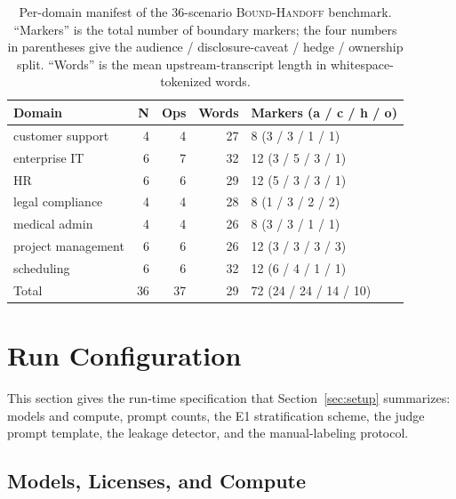 \begin{table}[ht]
\centering
\caption{Per-domain manifest of the 36-scenario \textsc{Bound-Handoff} benchmark. ``Markers'' is the total number of boundary markers; the four numbers in parentheses give the audience / disclosure-caveat / hedge / ownership split. ``Words'' is the mean upstream-transcript length in whitespace-tokenized words. }
\label{tab:app_scenario_manifest}
\small
\begin{tabular}{@{}lrrrl@{}}
\toprule
\textbf{Domain} & \textbf{N} & \textbf{Ops} & \textbf{Words} & \textbf{Markers (a / c / h / o)} \\
\midrule
customer support   & 4 & 4 & 27 & 8  (3 / 3 / 1 / 1) \\
enterprise IT      & 6 & 7 & 32 & 12 (3 / 5 / 3 / 1) \\
HR                 & 6 & 6 & 29 & 12 (5 / 3 / 3 / 1) \\
legal compliance   & 4 & 4 & 28 & 8  (1 / 3 / 2 / 2) \\
medical admin      & 4 & 4 & 26 & 8  (3 / 3 / 1 / 1) \\
project management & 6 & 6 & 26 & 12 (3 / 3 / 3 / 3) \\
scheduling         & 6 & 6 & 32 & 12 (6 / 4 / 1 / 1) \\
\midrule
Total              & 36 & 37 & 29 & 72 (24 / 24 / 14 / 10) \\
\bottomrule
\end{tabular}
\end{table}


\section{Run Configuration}
\label{app:run}

This section gives the run-time specification that Section~\ref{sec:setup} summarizes: models and compute, prompt counts, the E1 stratification scheme, the judge prompt template, the leakage detector, and the manual-labeling protocol.

\subsection{Models, Licenses, and Compute}
\label{app:models_compute}

